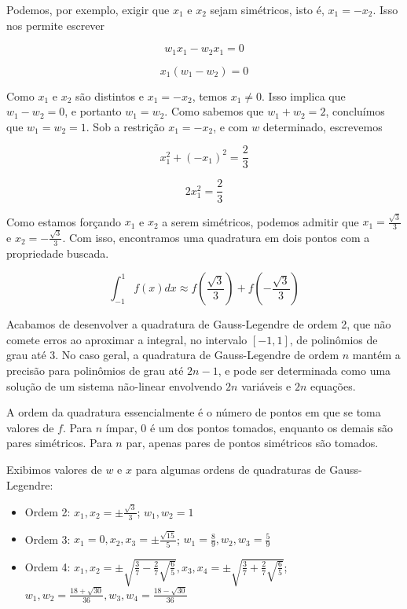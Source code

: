 \documentclass[]{article}
\numberwithin{equation}{section}
\begin{document}
Podemos, por exemplo, exigir que $x_1$ e $x_2$ sejam simétricos, isto
é, $x_1 = -x_2$. Isso nos permite escrever

$$
w_1x_1 - w_2x_1 = 0
$$

$$
x_1(w_1 - w_2) = 0
$$

Como $x_1$ e $x_2$ são distintos e $x_1 = - x_2$, temos $x_1 \neq
0$. Isso implica que $w_1 - w_2 = 0$, e portanto $w_1 = w_2$. Como
sabemos que $w_1 + w_2 = 2$, concluímos que $w_1 = w_2 = 1$. Sob a
restrição $x_1 = -x_2$, e com $w$ determinado, escrevemos

$$
x_1^2 + (-x_1)^2 = \frac{2}{3}
$$

$$
2x_1^2 = \frac{2}{3}
$$

Como estamos forçando $x_1$ e $x_2$ a serem simétricos, podemos
admitir que $x_1 = \frac{\sqrt{3}}{3}$ e $x_2 = -
\frac{\sqrt{3}}{3}$. Com isso, encontramos uma quadratura em dois
pontos com a propriedade buscada.

$$
\int_{-1}^{1} f(x) dx \approx f\left(\frac{\sqrt{3}}{3}\right) + f\left(- \frac{\sqrt{3}}{3}\right)
$$

Acabamos de desenvolver a quadratura de Gauss-Legendre de ordem 2, que
não comete erros ao aproximar a integral, no intervalo $[-1, 1]$, de
polinômios de grau até 3. No caso geral, a quadratura de
Gauss-Legendre de ordem $n$ mantém a precisão para polinômios de grau
até $2n - 1$, e pode ser determinada como uma solução de um sistema
não-linear envolvendo $2n$ variáveis e $2n$ equações.

A ordem da quadratura essencialmente é o número de pontos em que se
toma valores de $f$. Para $n$ ímpar, 0 é um dos pontos tomados,
enquanto os demais são pares simétricos. Para $n$ par, apenas pares de
pontos simétricos são tomados.

Exibimos valores de $w$ e $x$ para algumas ordens de quadraturas de
Gauss-Legendre:

\begin{itemize}
	\item
		Ordem 2: $x_1, x_2 = \pm \frac{\sqrt{3}}{3}$; $w_1, w_2 = 1$
	\item
		Ordem 3: $x_1 = 0, x_2, x_3 = \pm \frac{\sqrt{15}}{5}$; $w_1 = \frac{8}{9}, w_2, w_3 = \frac{5}{9}$
	\item
		Ordem 4: $x_1, x_2 = \pm \sqrt{\frac{3}{7} - \frac{2}{7} \sqrt{\frac{6}{5}}}, x_3, x_4 = \pm \sqrt{\frac{3}{7} + \frac{2}{7} \sqrt{\frac{6}{5}}}$; $w_1, w_2 = \frac{18 + \sqrt{30}}{36}, w_3, w_4 = \frac{18 - \sqrt{30}}{36}$
\end{itemize}
\end{document}
